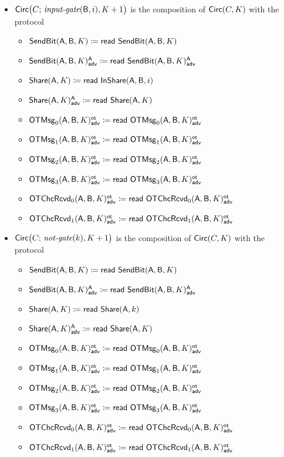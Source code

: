 \begin{itemize}
\item $\Circ\big(C; \, \inputgate(\B,i),K+1\big)$ is the composition of $\Circ(C,K)$ with the protocol
\begin{itemize}
\item $\SendBit(\A,\B,K) \coloneqq \read{\SendBit(\A,\B,K)}$
\item {\color{blue} $\LeakSendBit(\A,\B,K)^\A_\adv \coloneqq \read{\LeakSendBit(\A,\B,K)^\A_\adv}$}\smallskip
\item $\Share(\A,K) \coloneqq \read{\InShare(\A,\B,i)}$
\item {\color{blue} $\LeakShare(\A,K)^\A_\adv \coloneqq \read{\Share(\A,K)}$}\smallskip
\item {\color{blue} $\LeakOTMsg_0(\A,\B,K)^\ot_\adv \coloneqq \read{\LeakOTMsg_0(\A,\B,K)^\ot_\adv}$}
\item {\color{blue} $\LeakOTMsg_1(\A,\B,K)^\ot_\adv \coloneqq \read{\LeakOTMsg_1(\A,\B,K)^\ot_\adv}$}
\item {\color{blue} $\LeakOTMsg_2(\A,\B,K)^\ot_\adv \coloneqq \read{\LeakOTMsg_2(\A,\B,K)^\ot_\adv}$}
\item {\color{blue} $\LeakOTMsg_3(\A,\B,K)^\ot_\adv \coloneqq \read{\LeakOTMsg_3(\A,\B,K)^\ot_\adv}$}\smallskip
\item {\color{blue} $\LeakOTChcRcvd_0(\A,\B,K)^\ot_\adv \coloneqq \read{\LeakOTChcRcvd_0(\A,\B,K)^\ot_\adv}$}
\item {\color{blue} $\LeakOTChcRcvd_1(\A,\B,K)^\ot_\adv \coloneqq \read{\LeakOTChcRcvd_1(\A,\B,K)^\ot_\adv}$}
\end{itemize}

\item $\Circ\big(C; \, \notgate(k),K+1\big)$ is the composition of $\Circ(C,K)$ with the protocol
\begin{itemize}
\item $\SendBit(\A,\B,K) \coloneqq \read{\SendBit(\A,\B,K)}$
\item {\color{blue} $\LeakSendBit(\A,\B,K)^\A_\adv \coloneqq \read{\LeakSendBit(\A,\B,K)^\A_\adv}$}\smallskip
\item $\Share(\A,K) \coloneqq \read{\Share(\A,k)}$
\item {\color{blue} $\LeakShare(\A,K)^\A_\adv \coloneqq \read{\Share(\A,K)}$}\smallskip
\item {\color{blue} $\LeakOTMsg_0(\A,\B,K)^\ot_\adv \coloneqq \read{\LeakOTMsg_0(\A,\B,K)^\ot_\adv}$}
\item {\color{blue} $\LeakOTMsg_1(\A,\B,K)^\ot_\adv \coloneqq \read{\LeakOTMsg_1(\A,\B,K)^\ot_\adv}$}
\item {\color{blue} $\LeakOTMsg_2(\A,\B,K)^\ot_\adv \coloneqq \read{\LeakOTMsg_2(\A,\B,K)^\ot_\adv}$}
\item {\color{blue} $\LeakOTMsg_3(\A,\B,K)^\ot_\adv \coloneqq \read{\LeakOTMsg_3(\A,\B,K)^\ot_\adv}$}\smallskip
\item {\color{blue} $\LeakOTChcRcvd_0(\A,\B,K)^\ot_\adv \coloneqq \read{\LeakOTChcRcvd_0(\A,\B,K)^\ot_\adv}$}
\item {\color{blue} $\LeakOTChcRcvd_1(\A,\B,K)^\ot_\adv \coloneqq \read{\LeakOTChcRcvd_1(\A,\B,K)^\ot_\adv}$}
\end{itemize}


\end{itemize}
